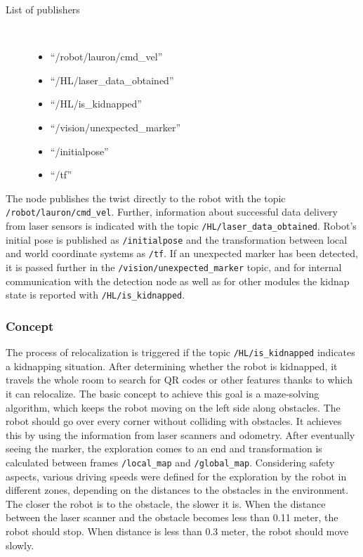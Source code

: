 \begin{description}	
\item[List of publishers]\
	\begin{itemize}
	\item ``/robot/lauron/cmd\_vel''
	\item ``/HL/laser\_data\_obtained''
	\item ``/HL/is\_kidnapped''
	\item ``/vision/unexpected\_marker''
	\item ``/initialpose''
	\item ``/tf''
	\end{itemize}
\end{description}

The node publishes the twist directly to the robot with the topic \texttt{/robot/lauron/cmd\_vel}. Further, information about successful data delivery from laser sensors is indicated with the topic \texttt{/HL/laser\_data\_obtained}. Robot's initial pose is published as \texttt{/initialpose} and the transformation between local and world coordinate systems as \texttt{/tf}. If an unexpected marker has been detected, it is passed further in the \texttt{/vision/unexpected\_marker} topic, and for internal communication with the detection node as well as for other modules the kidnap state is reported with \texttt{/HL/is\_kidnapped}.

\subsubsection{Concept}
The process of relocalization is triggered if the topic \texttt{/HL/is\_kidnapped} indicates a kidnapping situation. After determining whether the robot is kidnapped, it travels the whole room to search for QR codes or other features thanks to which it can relocalize. The basic concept to achieve this goal is a maze-solving algorithm, which keeps the robot moving on the left side along obstacles. The robot should go over every corner without colliding with obstacles. It achieves this by using the information from laser scanners and odometry. After eventually seeing the marker, the exploration comes to an end and transformation is calculated between frames \texttt{/local\_map} and \texttt{/global\_map}. Considering safety aspects, various driving speeds were defined for the exploration by the robot in different zones, depending on the distances to the obstacles in the environment. The closer the robot is to the obstacle, the slower it is. When the distance between the laser scanner and the obstacle becomes less than 0.11 meter, the robot should stop. When distance is less than 0.3 meter, the robot should move slowly.

